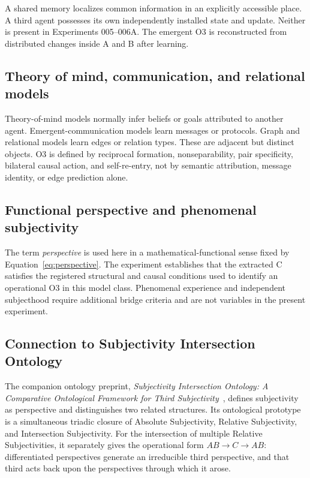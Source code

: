 \documentclass[11pt,a4paper]{article}
\begin{document}
A shared memory localizes common information in an explicitly accessible place. A third agent possesses its own independently installed state and update. Neither is present in Experiments 005--006A. The emergent O3 is reconstructed from distributed changes inside A and B after learning.

\subsection{Theory of mind, communication, and relational models}

Theory-of-mind models normally infer beliefs or goals attributed to another agent. Emergent-communication models learn messages or protocols. Graph and relational models learn edges or relation types. These are adjacent but distinct objects. O3 is defined by reciprocal formation, nonseparability, pair specificity, bilateral causal action, and self-re-entry, not by semantic attribution, message identity, or edge prediction alone.

\subsection{Functional perspective and phenomenal subjectivity}

The term \emph{perspective} is used here in a mathematical-functional sense fixed by Equation~\eqref{eq:perspective}. The experiment establishes that the extracted C satisfies the registered structural and causal conditions used to identify an operational O3 in this model class. Phenomenal experience and independent subjecthood require additional bridge criteria and are not variables in the present experiment.

\subsection{Connection to Subjectivity Intersection Ontology}

The companion ontology preprint, \emph{Subjectivity Intersection Ontology: A Comparative Ontological Framework for Third Subjectivity}~\cite{watanabe2026sio}, defines subjectivity as perspective and distinguishes two related structures. Its ontological prototype is a simultaneous triadic closure of Absolute Subjectivity, Relative Subjectivity, and Intersection Subjectivity. For the intersection of multiple Relative Subjectivities, it separately gives the operational form $AB\rightarrow C\rightarrow AB$: differentiated perspectives generate an irreducible third perspective, and that third acts back upon the perspectives through which it arose.
\end{document}
